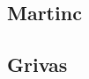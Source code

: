 \subsection{Martinc}
\label{sec:algoritmos_martinc}

\subsection{Grivas}
\label{sec:algoritmos_grivas}
